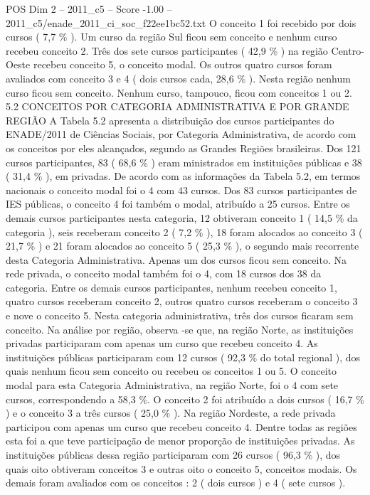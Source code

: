 \begin{textsample}{POS Dim 2 – 2011\_c5 – Score -1.00 – 2011\_c5/enade\_2011\_ci\_soc\_f22ee1bc52.txt}
O conceito 1 foi recebido por dois cursos ( 7,7 \% ).
Um curso da região Sul ficou sem conceito e nenhum curso recebeu conceito 2.
Três dos sete cursos participantes ( 42,9 \% ) na região Centro-Oeste recebeu conceito 5, o conceito modal.
Os outros quatro cursos foram avaliados com conceito 3 e 4 ( dois cursos cada, 28,6 \% ).
Nesta região nenhum curso ficou sem conceito.
Nenhum curso, tampouco, ficou com conceitos 1 ou 2. 5.2 CONCEITOS POR CATEGORIA ADMINISTRATIVA E POR GRANDE REGIÃO A Tabela 5.2 apresenta a distribuição dos cursos participantes do ENADE/2011 de Ciências Sociais, por Categoria Administrativa, de acordo com os conceitos por eles alcançados, segundo as Grandes Regiões brasileiras.
Dos 121 cursos participantes, 83 ( 68,6 \% ) eram ministrados em instituições públicas e 38 ( 31,4 \% ), em privadas.
De acordo com as informações da Tabela 5.2, em termos nacionais o conceito modal foi o 4 com 43 cursos.
Dos 83 cursos participantes de IES públicas, o conceito 4 foi também o modal, atribuído a 25 cursos.
Entre os demais cursos participantes nesta categoria, 12 obtiveram conceito 1 ( 14,5 \% da categoria ), seis receberam conceito 2 ( 7,2 \% ), 18 foram alocados ao conceito 3 ( 21,7 \% ) e 21 foram alocados ao conceito 5 ( 25,3 \% ), o segundo mais recorrente desta Categoria Administrativa.
Apenas um dos cursos ficou sem conceito.
Na rede privada, o conceito modal também foi o 4, com 18 cursos dos 38 da categoria.
Entre os demais cursos participantes, nenhum recebeu conceito 1, quatro cursos receberam conceito 2, outros quatro cursos receberam o conceito 3 e nove o conceito 5.
Nesta categoria administrativa, três dos cursos ficaram sem conceito.
Na análise por região, observa -se que, na região Norte, as instituições privadas participaram com apenas um curso que recebeu conceito 4.
As instituições públicas participaram com 12 cursos ( 92,3 \% do total regional ), dos quais nenhum ficou sem conceito ou recebeu os conceitos 1 ou 5.
O conceito modal para esta Categoria Administrativa, na região Norte, foi o 4 com sete cursos, correspondendo a 58,3 \%.
O conceito 2 foi atribuído a dois cursos ( 16,7 \% ) e o conceito 3 a três cursos ( 25,0 \% ).
Na região Nordeste, a rede privada participou com apenas um curso que recebeu conceito 4.
Dentre todas as regiões esta foi a que teve participação de menor proporção de instituições privadas.
As instituições públicas dessa região participaram com 26 cursos ( 96,3 \% ), dos quais oito obtiveram conceitos 3 e outras oito o conceito 5, conceitos modais.
Os demais foram avaliados com os conceitos : 2 ( dois cursos ) e 4 ( sete cursos ).

\end{textsample}
